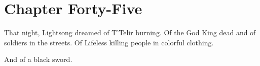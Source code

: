 \section{Chapter Forty-Five}

That night, Lightsong dreamed of T’Telir burning. Of the God King dead and of soldiers in the streets. Of Lifeless killing people in colorful clothing.

And of a black sword.

